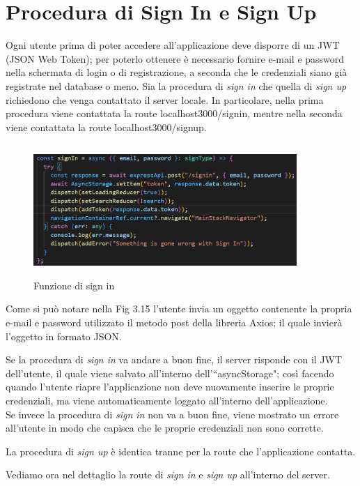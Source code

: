 \section{Procedura di Sign In e Sign Up}
Ogni utente prima di poter accedere all'applicazione deve disporre di un JWT (JSON Web Token); per poterlo ottenere \`e necessario fornire
e-mail e password nella schermata di login o di registrazione, a seconda che le credenziali siano gi\`a registrate nel database o meno.
Sia la procedura di \textit{sign in}  che quella di \textit{sign up} richiedono che venga contattato il server locale. In particolare, nella prima procedura viene
contattata la route localhost3000/signin, mentre nella seconda viene contattata la route localhost3000/signup.
\begin{figure}[h]
    \centering
    \includegraphics[width=10cm, height=5cm]{images/signInApplication.png}
    \caption[differenzeiteot]{Funzione di sign in}
    \label{fig:sign in}
\end{figure}

Come si pu\`o notare nella Fig 3.15 l'utente invia un oggetto contenente la propria e-mail e password utilizzato il metodo post della libreria Axios;
il quale invier\`a l'oggetto in formato JSON.

Se la procedura di \textit{sign in} va andare a buon fine, il server risponde con il JWT dell'utente, il quale viene salvato all'interno dell'``asyncStorage"; cos\`i facendo quando l'utente riapre
l'applicazione non deve nuovamente inserire le proprie credenziali, ma viene automaticamente loggato all'interno dell'applicazione.\\
Se invece la procedura di \textit{sign in} non va a buon fine, viene mostrato un errore all'utente in modo che capisca che le proprie credenziali non sono corrette.

La procedura di \textit{sign up} \`e identica tranne per la route che l'applicazione contatta.

Vediamo ora nel dettaglio la route di \textit{sign in} e \textit{sign up} all'interno del server.
